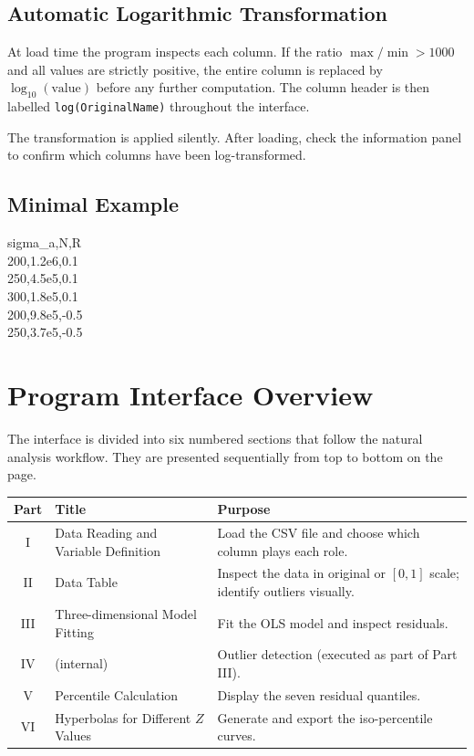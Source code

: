 \documentclass[12pt,a4paper]{article}
\begin{document}
\subsection{Automatic Logarithmic Transformation}

At load time the program inspects each column.  If the ratio
$\max / \min > 1000$ and all values are strictly positive, the entire column is
replaced by $\log_{10}(\text{value})$ before any further computation.  The column
header is then labelled \texttt{log(OriginalName)} throughout the interface.

\begin{notebox}
    The transformation is applied silently.  After loading, check the information
    panel to confirm which columns have been log-transformed.
\end{notebox}

\subsection{Minimal Example}

\begin{infobox}
sigma\_a,N,R\\
200,1.2e6,0.1\\
250,4.5e5,0.1\\
300,1.8e5,0.1\\
200,9.8e5,-0.5\\
250,3.7e5,-0.5
\end{infobox}

\section{Program Interface Overview}

The interface is divided into six numbered sections that follow the natural analysis
workflow.  They are presented sequentially from top to bottom on the page.

\begin{center}
\renewcommand{\arraystretch}{1.3}
\begin{tabular}{@{}clp{8.5cm}@{}}
\toprule
\textbf{Part} & \textbf{Title} & \textbf{Purpose} \\
\midrule
I   & Data Reading and Variable Definition & Load the CSV file and choose which column plays each role. \\
II  & Data Table & Inspect the data in original or $[0,1]$ scale; identify outliers visually. \\
III & Three-dimensional Model Fitting & Fit the OLS model and inspect residuals. \\
IV  & (internal)  & Outlier detection (executed as part of Part III). \\
V   & Percentile Calculation & Display the seven residual quantiles. \\
VI  & Hyperbolas for Different $Z$ Values & Generate and export the iso-percentile curves. \\
\bottomrule
\end{tabular}
\end{center}
\end{document}
